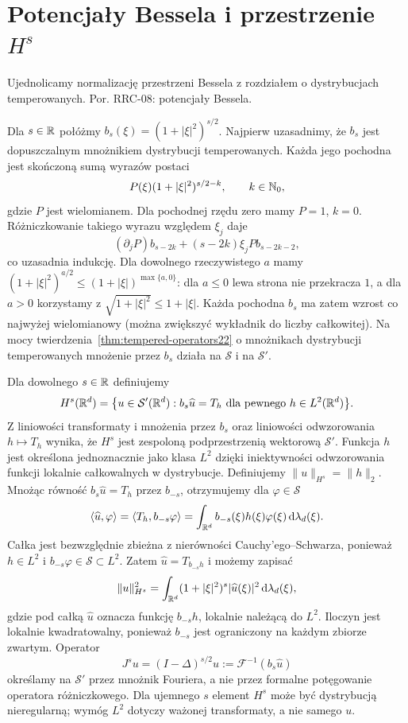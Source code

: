 
\section{Potencjały Bessela i przestrzenie \texorpdfstring{$H^s$}{Hs}}
\label{sec:dt-bessel}
\providecommand{\atlasref}[2]{#2}

Ujednolicamy normalizację przestrzeni Bessela z rozdziałem
o dystrybucjach temperowanych. Por.
\atlasref{PDE-08::thm:pde8-Hs}{RRC-08: potencjały Bessela}.


Dla $s\in\mathbb R$ połóżmy $b_s(\xi)=(1+|\xi|^2)^{s/2}$.
Najpierw uzasadnimy, że $b_s$ jest dopuszczalnym
mnożnikiem dystrybucji temperowanych.
Każda jego pochodna jest skończoną sumą wyrazów
postaci
\[
 P(\xi)(1+|\xi|^2)^{s/2-k},
 \qquad k\in\mathbb N_0,
\]
gdzie $P$ jest wielomianem. Dla pochodnej rzędu
zero mamy $P=1$, $k=0$. Różniczkowanie takiego
wyrazu względem $\xi_j$ daje
\[
 (\partial_j P)b_{s-2k}
 +(s-2k)\xi_j P b_{s-2k-2},
\]
co uzasadnia indukcję.
Dla dowolnego rzeczywistego $a$ mamy
$(1+|\xi|^2)^{a/2}\le(1+|\xi|)^{\max\{a,0\}}$:
dla $a\le0$ lewa strona nie przekracza $1$,
a dla $a>0$ korzystamy z
$\sqrt{1+|\xi|^2}\le1+|\xi|$.
Każda pochodna $b_s$ ma zatem wzrost co najwyżej
wielomianowy (można zwiększyć wykładnik do
liczby całkowitej). Na mocy twierdzenia~\ref{thm:tempered-operators22}
o mnożnikach dystrybucji temperowanych
mnożenie przez $b_s$ działa na $\mathcal S$
i na $\mathcal S'$.

\begin{definicja}
\label{def:dt-Hs}
Dla dowolnego $s\in\mathbb R$ definiujemy
\[
 H^s(\mathbb R^d)=\bigl\{u\in\mathcal S'(\mathbb R^d):
 b_s\widehat u=T_h\text{ dla pewnego }
 h\in L^2(\mathbb R^d)\bigr\}.
\]
Z liniowości transformaty i mnożenia przez $b_s$
oraz liniowości odwzorowania $h\mapsto T_h$
wynika, że $H^s$ jest zespoloną podprzestrzenią
wektorową $\mathcal S'$.
Funkcja $h$ jest określona jednoznacznie jako
klasa $L^2$ dzięki iniektywności odwzorowania
funkcji lokalnie całkowalnych w dystrybucje.
Definiujemy
$\|u\|_{H^s}=\|h\|_2$.
Mnożąc równość $b_s\widehat u=T_h$ przez
$b_{-s}$, otrzymujemy dla $\varphi\in\mathcal S$
\[
 \langle\widehat u,\varphi\rangle
 =\langle T_h,b_{-s}\varphi\rangle
 =\int_{\mathbb R^d}b_{-s}(\xi)h(\xi)\varphi(\xi)
 \,\mathrm d\lambda_d(\xi).
\]
Całka jest bezwzględnie zbieżna z nierówności
Cauchy'ego--Schwarza, ponieważ $h\in L^2$
i $b_{-s}\varphi\in\mathcal S\subset L^2$.
Zatem $\widehat u=T_{b_{-s}h}$ i możemy zapisać
\[
 \|u\|_{H^s}^2=\int_{\mathbb R^d}
 (1+|\xi|^2)^s|\widehat u(\xi)|^2\,
 \mathrm d\lambda_d(\xi),
\]
gdzie pod całką $\widehat u$ oznacza funkcję
$b_{-s}h$, lokalnie należącą do $L^2$.
Iloczyn jest lokalnie kwadratowalny, ponieważ
$b_{-s}$ jest ograniczony na każdym zbiorze zwartym.
Operator
\[
 J^s u=(I-\Delta)^{s/2}u
 :=\mathcal F^{-1}(b_s\widehat u)
\]
określamy na $\mathcal S'$ przez mnożnik Fouriera,
a nie przez formalne potęgowanie operatora
różniczkowego.
Dla ujemnego $s$ element $H^s$ może być
dystrybucją nieregularną; wymóg $L^2$ dotyczy
ważonej transformaty, a nie samego $u$.
\end{definicja}

